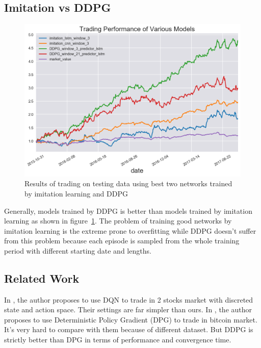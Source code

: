 \documentclass[a4paper, 10pt]{article}
\begin{document}
\begin{spacing}{1.2}
    \subsection{Imitation vs DDPG}
    \begin{figure}
      \centering
      \includegraphics[scale=0.7]{imitation_vs_ddpg}
      \caption{Results of trading on testing data using best two networks trained by imitation learning and DDPG}
      \label{fig:imitation_vs_ddpg}
    \end{figure}
    Generally, models trained by DDPG is better than models trained by imitation learning as shown in figure~\ref{fig:imitation_vs_ddpg}. The problem of training good networks by imitation learning is the extreme prone to overfitting while DDPG doesn't suffer from this problem because each episode is sampled from the whole training period with different starting date and lengths.
%    
%    
    
    \subsection{Related Work}
    In \cite{cs229_stanford_portfolio, cs229_stanford_trading}, the author proposes to use DQN to trade in 2 stocks market with discreted state and action space. Their settings are far simpler than ours. In \cite{DBLP:journals/corr/JiangXL17}, the author proposes to use Deterministic Policy Gradient (DPG) to trade in bitcoin market. It's very hard to compare with them because of different dataset. But DDPG is strictly better than DPG in terms of performance and convergence time.
    

\end{spacing}
\end{document}
